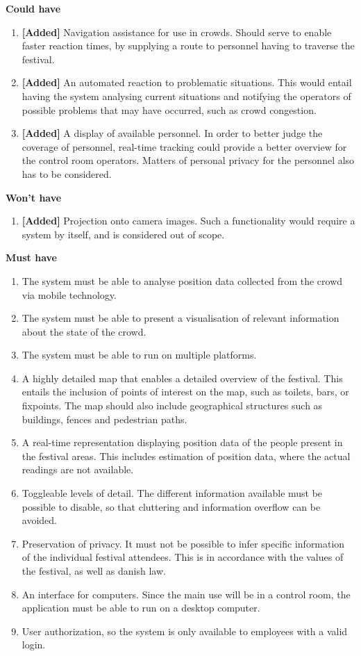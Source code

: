 \textbf{Could have}
\begin{enumerate}[resume]
    \item \textbf{[Added]} Navigation assistance for use in crowds. Should serve to enable faster reaction times, by supplying a route to personnel having to traverse the festival.
    \item \textbf{[Added]} An automated reaction to problematic situations. This would entail having the system analysing current situations and notifying the operators of possible problems that may have occurred, such as crowd congestion.
    \item \textbf{[Added]} A display of available personnel. In order to better judge the coverage of personnel, real-time tracking could provide a better overview for the control room operators. Matters of personal privacy for the personnel also has to be considered.
\end{enumerate}

\textbf{Won't have}
\begin{enumerate}[resume]
    \item \textbf{[Added]} Projection onto camera images. Such a functionality would require a system by itself, and is considered out of scope.
\end{enumerate}

\iffalse
\textbf{Must have}
\begin{enumerate}
    \item The system must be able to analyse position data collected from the crowd via mobile technology.
    \item The system must be able to present a visualisation of relevant information about the state of the crowd.
    \item The system must be able to run on multiple platforms.
    \item A highly detailed map that enables a detailed overview of the festival. This entails the inclusion of points of interest on the map, such as toilets, bars, or fixpoints. The map should also include geographical structures such as buildings, fences and pedestrian paths.
    \item A real-time representation displaying position data of the people present in the festival areas. This includes estimation of position data, where the actual readings are not available.
    \item Toggleable levels of detail. The different information available must be possible to disable, so that cluttering and information overflow can be avoided.
    \item Preservation of privacy. It must not be possible to infer specific information of the individual festival attendees. This is in accordance with the values of the festival, as well as danish law.
    \item An interface for computers. Since the main use will be in a control room, the application must be able to run on a desktop computer.
    \item User authorization, so the system is only available to employees with a valid login.
\end{enumerate}

